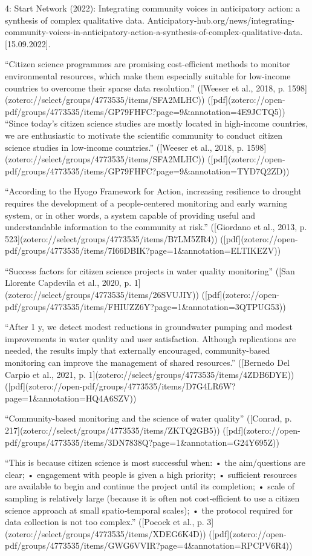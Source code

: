 {4: Start Network (2022): Integrating community voices in anticipatory action: a synthesis of complex qualitative data. Anticipatory-hub.org/news/integrating-community-voices-in-anticipatory-action-a-synthesis-of-complex-qualitative-data. [15.09.2022].

“Citizen science programmes are promising cost-efficient methods to monitor environmental resources, which make them especially suitable for low-income countries to overcome their sparse data resolution.” ([Weeser et al., 2018, p. 1598](zotero://select/groups/4773535/items/SFA2MLHC)) ([pdf](zotero://open-pdf/groups/4773535/items/GP79FHFC?page=9&annotation=4E9JCTQ5))
“Since today's citizen science studies are mostly located in high-income countries, we are enthusiastic to motivate the scientific community to conduct citizen science studies in low-income countries.” ([Weeser et al., 2018, p. 1598](zotero://select/groups/4773535/items/SFA2MLHC)) ([pdf](zotero://open-pdf/groups/4773535/items/GP79FHFC?page=9&annotation=TYD7Q2ZD))

“According to the Hyogo Framework for Action, increasing resilience to drought requires the development of a people-centered monitoring and early warning system, or in other words, a system capable of providing useful and understandable information to the community at risk.” ([Giordano et al., 2013, p. 523](zotero://select/groups/4773535/items/B7LM5ZR4)) ([pdf](zotero://open-pdf/groups/4773535/items/7I66DBIK?page=1&annotation=ELTIKEZV))

“Success factors for citizen science projects in water quality monitoring” ([San Llorente Capdevila et al., 2020, p. 1](zotero://select/groups/4773535/items/26SVUJIY)) ([pdf](zotero://open-pdf/groups/4773535/items/FHIUZZ6Y?page=1&annotation=3QTPUG53))

“After 1 y, we detect modest reductions in groundwater pumping and modest improvements in water quality and user satisfaction. Although replications are needed, the results imply that externally encouraged, community-based monitoring can improve the management of shared resources.” ([Bernedo Del Carpio et al., 2021, p. 1](zotero://select/groups/4773535/items/4ZDB6DYE)) ([pdf](zotero://open-pdf/groups/4773535/items/D7G4LR6W?page=1&annotation=HQ4A6SZV))

“Community-based monitoring and the science of water quality” ([Conrad, p. 217](zotero://select/groups/4773535/items/ZKTQ2GB5)) ([pdf](zotero://open-pdf/groups/4773535/items/3DN7838Q?page=1&annotation=G24Y695Z))

“This is because citizen  science is most successful when:   
• the aim/questions are clear;  
• engagement with people is given a high priority;  
• sufficient resources are available to begin and continue the project until its completion;  
• scale of sampling is relatively large (because it is often not cost‐efficient to use a citizen  science approach at small spatio‐temporal scales);  
• the protocol required for data collection is not too complex.”
([Pocock et al., p. 3](zotero://select/groups/4773535/items/XDEG6K4D)) ([pdf](zotero://open-pdf/groups/4773535/items/GWG6VVIR?page=4&annotation=RPCPV6R4))

}
